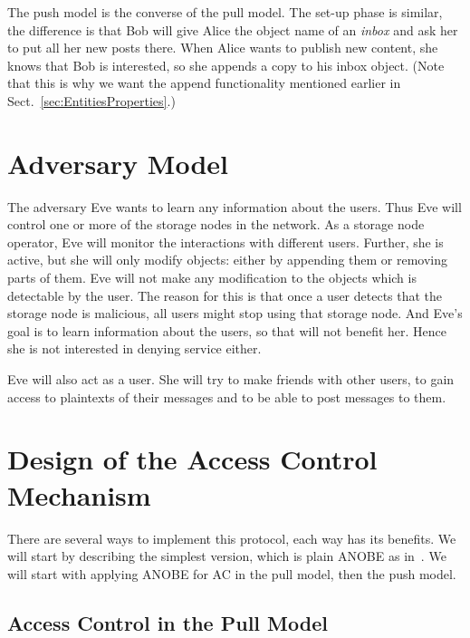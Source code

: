 The push model is the converse of the pull model.
The set-up phase is similar, the difference is that Bob will give Alice the 
object name of an \emph{inbox} and ask her to put all her new posts there.
When Alice wants to publish new content, she knows that Bob is interested, so 
she appends a copy to his inbox object.
(Note that this is why we want the append functionality mentioned earlier in 
Sect.~\ref{sec:EntitiesProperties}.)


\section{Adversary Model}\label{sec:Adversary}

The adversary Eve wants to learn any information about the users.
Thus Eve will control one or more of the storage nodes in the network.
As a storage node operator, Eve will monitor the interactions with different 
users.
Further, she is active, but she will only modify objects: either by appending 
them or removing parts of them.
Eve will not make any modification to the objects which is detectable by the 
user.
The reason for this is that once a user detects that the storage node is 
malicious, all users might stop using that storage node.
And Eve's goal is to learn information about the users, so that will not 
benefit her.
Hence she is not interested in denying service either.

Eve will also act as a user.
She will try to make friends with other users, to gain access to plaintexts of 
their messages and to be able to post messages to them.


\section{Design of the Access Control Mechanism}\label{sec:Design}

There are several ways to implement this protocol, each way has its benefits.
We will start by describing the simplest version, which is plain \ac{ANOBE} as 
in~\cite{ANOBE}.
We will start with applying \ac{ANOBE} for \ac{AC} in the pull model, then the 
push model.

\subsection{Access Control in the Pull Model}\label{sec:PullModelAC}

